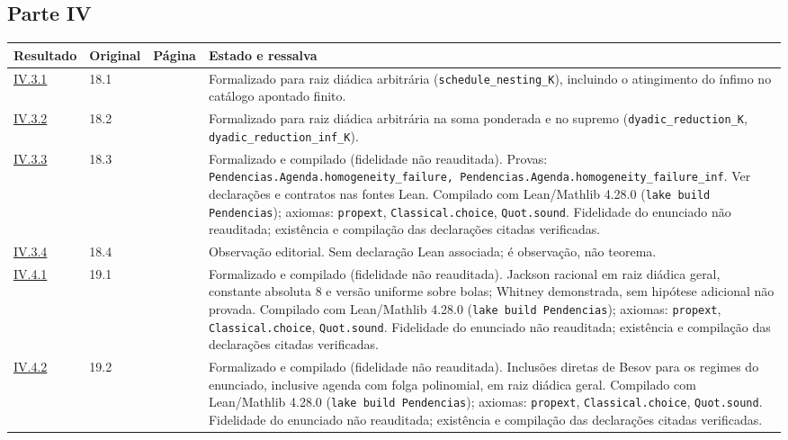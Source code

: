 \documentclass[12pt,a4paper]{article}
\theoremstyle{preciso}
\theoremstyle{definition}
\newcommand{\code}[1]{\nolinkurl{#1}}
\theoremstyle{preciso}
\theoremstyle{preciso}
\theoremstyle{preciso}
\theoremstyle{preciso}
\theoremstyle{definition}
\theoremstyle{preciso}
\theoremstyle{definition}
\theoremstyle{preciso}
\theoremstyle{preciso}
\theoremstyle{definition}
\begin{document}
\begin{singlespace}
\subsection*{Parte IV}
\small
\begin{longtable}{@{}p{.11\linewidth}p{.09\linewidth}p{.09\linewidth}p{.59\linewidth}@{}}
\toprule Resultado & Original & Página & Estado e ressalva\\\midrule\endhead
\hyperref[map:artigo_3:3.1]{IV.3.1} & 18.1 & \pageref{map:artigo_3:3.1} & Formalizado para raiz diádica arbitrária (\code{schedule_nesting_K}), incluindo o atingimento do ínfimo no catálogo apontado finito.\\[4pt]
\hyperref[map:artigo_3:3.2]{IV.3.2} & 18.2 & \pageref{map:artigo_3:3.2} & Formalizado para raiz diádica arbitrária na soma ponderada e no supremo (\code{dyadic_reduction_K}, \code{dyadic_reduction_inf_K}).\\[4pt]
\hyperref[map:artigo_3:3.3]{IV.3.3} & 18.3 & \pageref{map:artigo_3:3.3} & Formalizado e compilado (fidelidade não reauditada). Provas: \code{Pendencias.Agenda.homogeneity_failure, Pendencias.Agenda.homogeneity_failure_inf}. Ver declarações e contratos nas fontes Lean. Compilado com Lean/Mathlib 4.28.0 (\texttt{lake build Pendencias}); axiomas: \texttt{propext}, \texttt{Classical.choice}, \texttt{Quot.sound}. Fidelidade do enunciado não reauditada; existência e compilação das declarações citadas verificadas.\\[4pt]
\hyperref[map:artigo_3:3.4]{IV.3.4} & 18.4 & \pageref{map:artigo_3:3.4} & Observação editorial. Sem declaração Lean associada; é observação, não teorema.\\[4pt]
\hyperref[map:artigo_3:4.1]{IV.4.1} & 19.1 & \pageref{map:artigo_3:4.1} & Formalizado e compilado (fidelidade não reauditada). Jackson racional em raiz diádica geral, constante absoluta 8 e versão uniforme sobre bolas; Whitney demonstrada, sem hipótese adicional não provada. Compilado com Lean/Mathlib 4.28.0 (\texttt{lake build Pendencias}); axiomas: \texttt{propext}, \texttt{Classical.choice}, \texttt{Quot.sound}. Fidelidade do enunciado não reauditada; existência e compilação das declarações citadas verificadas.\\[4pt]
\hyperref[map:artigo_3:4.2]{IV.4.2} & 19.2 & \pageref{map:artigo_3:4.2} & Formalizado e compilado (fidelidade não reauditada). Inclusões diretas de Besov para os regimes do enunciado, inclusive agenda com folga polinomial, em raiz diádica geral. Compilado com Lean/Mathlib 4.28.0 (\texttt{lake build Pendencias}); axiomas: \texttt{propext}, \texttt{Classical.choice}, \texttt{Quot.sound}. Fidelidade do enunciado não reauditada; existência e compilação das declarações citadas verificadas.\\[4pt]

\end{longtable}
\end{singlespace}
\end{document}
